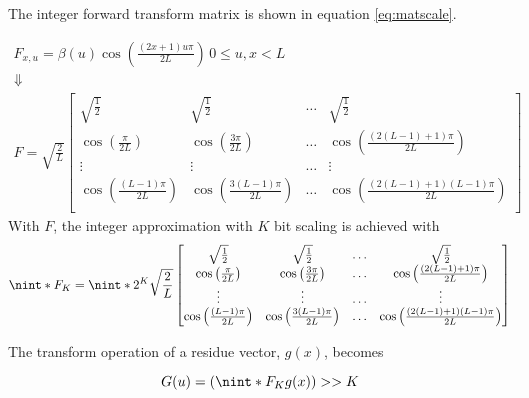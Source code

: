 The integer forward transform matrix is shown in equation \ref{eq:matscale}.

\begin{equation} \label{eq:matscale}
    \begin{gathered}
        F_{x,u} = \beta(u)\cos\left(\frac{(2x+1)u\pi }{2L}\right)\,0\leq u,x < L \\
        \Downarrow \\
        F           = \sqrt{\frac{2}{L}}  \begin{bmatrix}
            \sqrt{\frac{1}{2}}                                  & \sqrt{\frac{1}{2}}                                & \dots & \sqrt{\frac{1}{2}} \\
            \cos\left(\frac{\pi}{2L}\right)    & \cos\left(\frac{3\pi}{2L}\right) & \dots & \cos\left(\frac{(2(L-1)+1)\pi}{2L}\right) \\
            \vdots     & \vdots     & \dots & \vdots       \\
            \cos\left(\frac{(L-1)\pi}{2L}\right)    & \cos\left(\frac{3(L-1)\pi}{2L}\right) & \dots & \cos\left(\frac{(2(L-1)+1)(L-1)\pi}{2L}\right) \\
        \end{bmatrix} 
    \end{gathered}
\end{equation}
With $F$, the integer approximation with $K$ bit scaling is achieved with 
\begin{equation} \label{eq:matscale}
    \nint*{F_K}   = \nint*{2^K \sqrt{\frac{2}{L}}    \begin{bmatrix}
                                        \sqrt{\frac{1}{2}}                                  & \sqrt{\frac{1}{2}}                                & \dots & \sqrt{\frac{1}{2}} \\
                                        \cos\left(\frac{\pi}{2L}\right)    & \cos\left(\frac{3\pi}{2L}\right) & \dots & \cos\left(\frac{(2(L-1)+1)\pi}{2L}\right) \\
                                        \vdots     & \vdots     & \dots & \vdots       \\
                                        \cos\left(\frac{(L-1)\pi}{2L}\right)    & \cos\left(\frac{3(L-1)\pi}{2L}\right) & \dots & \cos\left(\frac{(2(L-1)+1)(L-1)\pi}{2L}\right) \\
                                \end{bmatrix} 
                }
\end{equation}

The transform operation of a residue vector, $g(x)$, becomes

\begin{equation}
    G(u) = \left(\nint*{F_K} g(x)\right)>>K
\end{equation}
